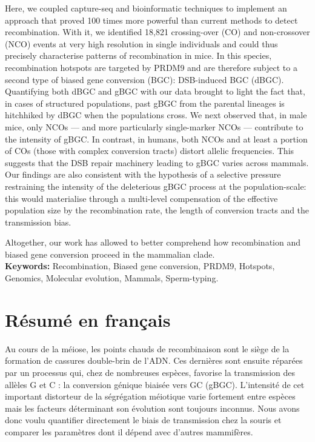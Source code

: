Here, we coupled capture-seq and bioinformatic techniques to implement an approach that proved 100 times more powerful than current methods to detect recombination. With it, we identified 18,821 crossing-over (CO) and non-crossover (NCO) events at very high resolution in single individuals and could thus precisely characterise patterns of recombination in mice.
In this species, recombination hotspots are targeted by PRDM9 and are therefore subject to a second type of biased gene conversion (BGC): DSB-induced BGC (dBGC). Quantifying both dBGC and gBGC with our data brought to light the fact that, in cases of structured populations, past gBGC from the parental lineages is hitchhiked by dBGC when the populations cross.
We next observed that, in male mice, only NCOs — and more particularly single-marker NCOs — contribute to the intensity of gBGC. In contrast, in humans, both NCOs and at least a portion of COs (those with complex conversion tracts) distort allelic frequencies. 
This suggests that the DSB repair machinery leading to gBGC varies across mammals.
Our findings are also consistent with the hypothesis of a selective pressure restraining the intensity of the deleterious gBGC process at the population-scale: this would materialise through a multi-level compensation of the effective population size by the recombination rate, the length of conversion tracts and the transmission bias.

Altogether, our work has allowed to better comprehend how recombination and biased gene conversion proceed in the mammalian clade.\\

\textbf{Keywords:} Recombination, Biased gene conversion, PRDM9, Hotspots, Genomics, Molecular evolution, Mammals, Sperm-typing.


\newpage
\section*{Résumé en français}

Au cours de la méiose, les points chauds de recombinaison sont le siège de la formation de cassures double-brin de l’ADN. Ces dernières sont ensuite réparées par un processus qui, chez de nombreuses espèces, favorise la transmission des allèles G et C : la conversion génique biaisée vers GC (gBGC). 
L'intensité de cet important distorteur de la ségrégation méiotique varie fortement entre espèces mais les facteurs déterminant son évolution sont toujours inconnus. 
Nous avons donc voulu quantifier directement le biais de transmission chez la souris et comparer les paramètres dont il dépend avec d'autres mammifères.

